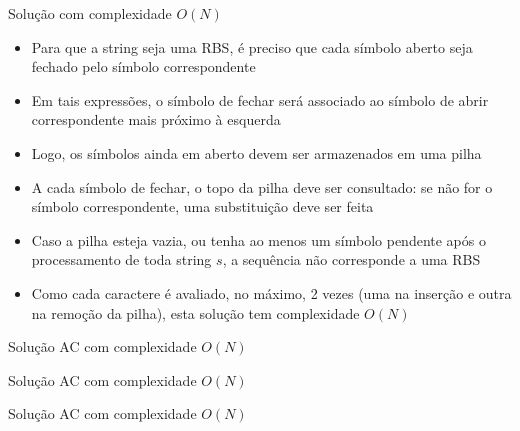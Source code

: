 \begin{frame}[fragile]{Solução com complexidade $O(N)$}

    \begin{itemize}
        \item Para que a string seja uma RBS, é preciso que cada símbolo aberto seja fechado
            pelo símbolo correspondente

        \item Em tais expressões, o símbolo de fechar será associado ao símbolo de abrir 
            correspondente mais próximo à esquerda

        \item Logo, os símbolos ainda em aberto devem ser armazenados em uma pilha

        \item A cada símbolo de fechar, o topo da pilha deve ser consultado: se não for o símbolo
            correspondente, uma substituição deve ser feita

        \item Caso a pilha esteja vazia, ou tenha ao menos um símbolo pendente após o processamento
            de toda string $s$, a sequência não corresponde a uma RBS

        \item Como cada caractere é avaliado, no máximo, 2 vezes (uma na inserção e outra na 
            remoção da pilha), esta solução tem complexidade $O(N)$
   \end{itemize}

\end{frame}

\begin{frame}[fragile]{Solução AC com complexidade $O(N)$}
\end{frame}

\begin{frame}[fragile]{Solução AC com complexidade $O(N)$}
\end{frame}

\begin{frame}[fragile]{Solução AC com complexidade $O(N)$}
\end{frame}
